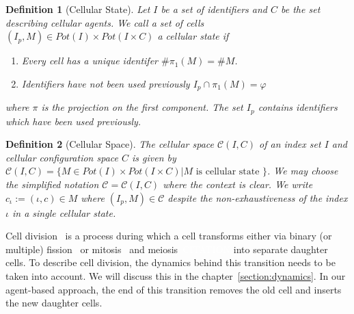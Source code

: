 \documentclass{article}
\newcommand{\todo}[1]{\colorbox{WildStrawberry}{\textcolor{white}{#1}}}
\newtheorem{definition}{Definition}[section]
\begin{document}
\begin{definition}[Cellular State]
    \label{def:cellular-state}
    Let $I$ be a set of identifiers and $C$ be the set describing cellular agents.
    We call a set of cells $(I_p,M)\in Pot(I)\times Pot(I\times C)$ a cellular state if
    \begin{enumerate}
        \item Every cell has a unique identifer $\#\pi_1(M)=\#M$.
        \item Identifiers have not been used previously $I_p\cap\pi_1(M)=\varphi$
    \end{enumerate}
    where $\pi$ is the projection on the first component.
    The set $I_p$ contains identifiers which have been used previously.
\end{definition}

\begin{definition}[Cellular Space]
    \label{def:cellular-space}
    The cellular space $\mathscr{C}(I, C)$ of an index set $I$ and cellular configuration space $C$
    is given by
    $\mathscr{C}(I,C) = \{M\in Pot(I)\times Pot(I\times C) | M \text{ is cellular state }\}$.
    We may choose the simplified notation $\mathscr{C} = \mathscr{C}(I, C)$ where the context is
    clear.
    We write $c_\iota:=(\iota,c)\in M$ where $(I_p,M)\in\mathscr{C}$ despite the non-exhaustiveness
    of the index $\iota$ in a single cellular state.
\end{definition}

Cell division~\cite{bhlitem268752} is a process during which a cell transforms either via binary
(or multiple) fission~\cite{Biov2014} or mitosis~\cite{Ilowiecki1981,von1835resp} and
meiosis~\todo{CITATION} into separate
daughter cells.
To describe cell division, the dynamics behind this transition needs to be taken into account.
We will discuss this in the chapter~\ref{section:dynamics}.
In our agent-based approach, the end of this transition removes the old cell and inserts the new
daughter cells.
\end{document}
